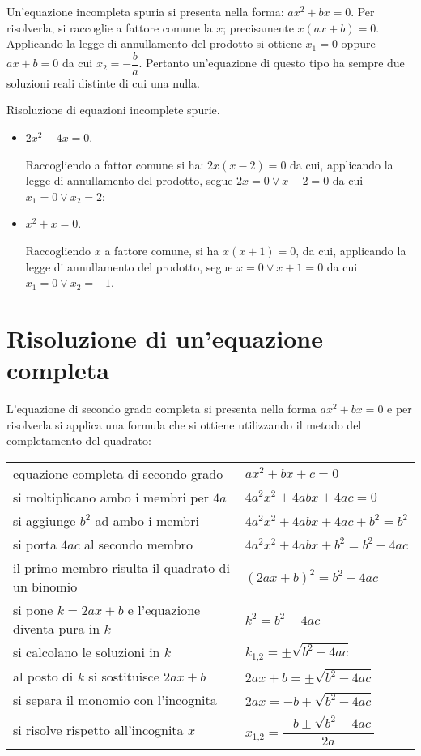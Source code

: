 Un'equazione incompleta spuria si presenta nella forma: $a x ^{2} + b x = 0$.
Per risolverla, si raccoglie a fattore comune la
$x$; precisamente $x ( a x + b ) = 0$.
Applicando la legge di annullamento del prodotto si ottiene
$x_{1} = 0$ oppure $ax + b = 0$ da cui $x_{2} = - \dfrac{b}{a}$.
Pertanto un'equazione di questo tipo ha sempre due soluzioni reali distinte di cui una nulla.
\begin{exrig}
\begin{esempio}
Risoluzione di equazioni incomplete spurie.
\begin{itemize}
\item $2 x^{2} - 4 x = 0$.

Raccogliendo a fattor comune si ha: $2 x ( x - 2 ) = 0$ da cui, applicando la legge di annullamento del prodotto, segue $2x = 0 \vee x - 2 = 0$ da cui $x_{1} = 0 \vee x_{2} = 2$;
\item $x ^{2 } + x = 0$.

Raccogliendo $x$ a fattore comune, si ha $x ( x + 1 ) = 0$, da cui, applicando la legge di annullamento del prodotto, segue $x = 0 \vee x + 1 = 0$ da cui $x_{1} = 0 \vee x_{2} = - 1$.
\end{itemize}
\end{esempio}
\end{exrig}
\vspazio\ovalbox{\risolvii \ref{ese:3.5}, \ref{ese:3.6}, \ref{ese:3.7}, \ref{ese:3.8}}
\pagebreak
\section{Risoluzione di un'equazione completa}

L'equazione di secondo grado completa si presenta nella forma $a x ^{2} + b x = 0$ e per risolverla si applica una formula che si ottiene utilizzando il metodo del completamento del quadrato:

\begin{tabular}{ll}
equazione completa di secondo grado & $a x^{2} + b x + c=0$\\
si moltiplicano ambo i membri per $4a$ & $4 a^{2} x^{2} + 4 a b x + 4 a c=0$\\
si aggiunge $b^{2}$ ad ambo i membri & $4 a^{2} x^{2} + 4 a b x + 4 a c + b^{2}=b^{2}$\\
si porta $4ac$ al secondo membro & $4 a^{2} x^{2} + 4 a b x + b^{2}=b^{2} - 4 a c$\\
il primo membro risulta il quadrato di un binomio & $( 2 a x + b )^{2}=b^{2} - 4 a c$\\
si pone $k=2ax + b$ e l'equazione diventa pura in $k$ & $k^{2}=b^{2} - 4 a c$\\
si calcolano le soluzioni in $k$ & $k_{1\text{,}2}=\pm \sqrt{b^{2} - 4 a c}$\\
al posto di $k$ si sostituisce $2ax + b$ & $2 a x + b=\pm \sqrt{b^{2} - 4 a c}$\\
si separa il monomio con l'incognita & $2 a x=- b \pm \sqrt{b^{2} - 4 a c}$\\
si risolve rispetto all'incognita $x$ & $x_{1\text{,}2}=\dfrac{- b \pm \sqrt{b^{2} - 4 a c}}{2 a}$\\
\end{tabular}

